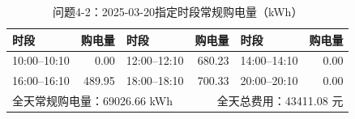 \begin{table}[H]\centering\small
\caption{问题4-2：2025-03-20指定时段常规购电量（kWh）}
\label{tab:q4_2_0320_purchase}
\begin{tabular}{lrlrlr}\toprule
时段 & 购电量 & 时段 & 购电量 & 时段 & 购电量 \\\midrule
10:00--10:10 & 0.00 & 12:00--12:10 & 680.23 & 14:00--14:10 & 0.00 \\
16:00--16:10 & 489.95 & 18:00--18:10 & 700.33 & 20:00--20:10 & 0.00 \\
\midrule
\multicolumn{3}{l}{全天常规购电量：69026.66 kWh} & \multicolumn{3}{r}{全天总费用：43411.08 元}\\
\bottomrule\end{tabular}\end{table}
